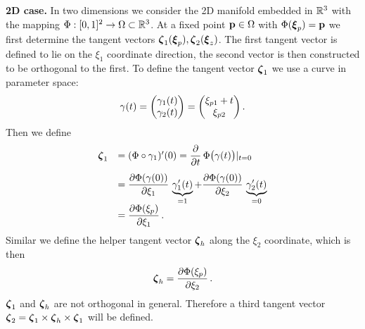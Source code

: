 \textbf{2D case.}
In two dimensions we consider the 2D manifold embedded in $\mathbb{R}^3$ with the mapping $\Phi: [0,1]^2 \to \Omega \subset \mathbb{R}^3$. At a fixed point $\textbf{p} \in \Omega$ with $\Phi(\boldsymbol{\xi}_p) = \textbf{p}$ we first determine the tangent vectors $\boldsymbol{\zeta}_1(\boldsymbol{\xi}_p), \boldsymbol{\zeta}_2(\boldsymbol{\xi}_z)$. The first tangent vector is defined to lie on the $\xi_1$ coordinate direction, the second vector is then constructed to be orthogonal to the first. To define the tangent vector $\boldsymbol{\zeta}_1$ we use a curve in parameter space:
\begin{equation*}
  \begin{array}{lll}
    \gamma(t) = \left(\begin{matrix}\gamma_1(t) \\ \gamma_2(t)\end{matrix}\right) = \left(\begin{matrix}\xi_{p1}+t \\ \xi_{p2} \end{matrix}\right).
  \end{array}
\end{equation*}
Then we define
\begin{equation*}
  \begin{array}{lll}
    \bfzeta_1 &= (\Phi \circ \gamma_1)'(0) 
    = \p{t}\Phi\big(\gamma(t)\big)|_{t=0} \\[4mm]
    &= \p{\Phi(\gamma(0))}{\xi_1}\ub{\gamma_1'(t)}{=1} + \p{\Phi(\gamma(0))}{\xi_2}\ub{\gamma_2'(t)}{=0}\\[4mm]
    &= \p{\Phi(\xi_p)}{\xi_1}.
  \end{array}
\end{equation*}
Similar we define the helper tangent vector $\boldsymbol{\zeta}_h$ along the $\xi_2$ coordinate, which is then
\begin{equation*}
  \begin{array}{lll}
    \bfzeta_h = \p{\Phi(\xi_p)}{\xi_2}.
  \end{array}
\end{equation*}
$\boldsymbol{\zeta}_1$ and $\boldsymbol{\zeta}_h$ are not orthogonal in general. Therefore a third tangent vector $\boldsymbol{\zeta}_2 = \boldsymbol{\zeta}_1\times \boldsymbol{\zeta}_h \times \boldsymbol{\zeta}_1$ will be defined.

